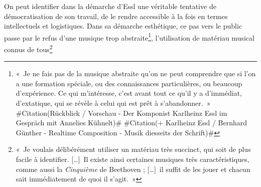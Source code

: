 \documentclass[a4paper,12pt]{article}
\newcommand{\guill}[1]{«~#1~»}
\newcommand{\zitat}[2]{\#Citation(#2)\#}
\newcommand{\tpp}[0]{[\dots]}
\begin{document}
On peut identifier dans la démarche d'Essl une véritable tentative de démocratisation de son travail, de le rendre accessible à la fois en termes intellectuels et logistiques. Dans sa démarche esthétique, ce pas vers le public passe par le refus d'une musique trop abstraite\footnote{\guill{Je ne fais pas de la musique abstraite qu'on ne peut comprendre que si l'on a une formation spéciale, ou des connaissances particulières, ou beaucoup d'expérience. Ce qui m'intéresse, c'est avant tout ce qu'il y a d'immédiat, d'extatique, qui se révèle à celui qui est prêt à s'abandonner.} \zitat{Ich mache keine abstrakte Musik, die man nur versteht, wenn man eine spezielle Ausbildung hat, oder Wissen oder viel Erfahrung. Mir geht es vor allem um das Unmittelbare, das Ekstatische, das sich demjenigen erschließt, der bereit ist sich dem hinzugeben. Ich habe die Erfahrung gemacht, dass es nicht darauf ankommt, ob man seinen Schönberg oder Webern studiert hat, seinen Mozart oder Bach. Wenn man die Bereitschaft hat sich zu öffnen, dann kann man sehr viel erleben. Ich glaube, dass das Hören immer ein interaktiver Prozess ist, letztlich würde ich sogar sagen, dass die Musik im Hörer selbst entsteht - durch den Akt des Hörens.}
{Rückblick / Vorschau - Der Komponist Karlheinz Essl im Gespräch mit Annelies Kühnelt}
\zitat{Deshalb glaube ich, dass das Wissen darum für den Hörer nicht unbedingt nötig ist. Die Stücke sollten deshalb sinnlich, also ganz im Bereich des Klanglichen, rezipiert werden. In beiden Fällen gehe ich jedoch vom Hören aus: die Strukturgeneratoren (ob sie nun die Lexikon-Sonate, Amazing Maze oder Champ d'Action betreffen) gehen immer von Wahrnehmungsphänomenen aus, niemals von abstrakten oder gar mathematischen Prämissen. Deshalb meine ich auch, dass sich meine Musik am besten durch offenes, bereitwilliges und vorbehaltloses Hören erschließt, in einem aktiven Wahrnehmungsprozess, in dem sich der Hörer aufgrund seiner jeweiligen persönlichen Voraussetzungen sozusagen seine eigene Fassung der Komposition mitkomponiert. Hören wird hier nicht zum bloßen Abbilden und Entziffern einer vorgegebenen Wirklichkeit, sondern zu einer schöpferischen Konstruktion.}
{+ Karlheinz Essl / Bernhard Günther - Realtime Composition - Musik diesseits der Schrift}}, l'utilisation de matériau musical connus de tous\footnote{\guill{Je voulais délibérément utiliser un matériau très succinct, qui soit de plus facile à identifier. \tpp~Il existe ainsi certaines musiques très caractéristiques, comme aussi la \emph{Cinquième} de Beethoven ; \tpp~il suffit de les jouer et chacun sait immédiatement de quoi il s'agit.}
}
\end{document}
